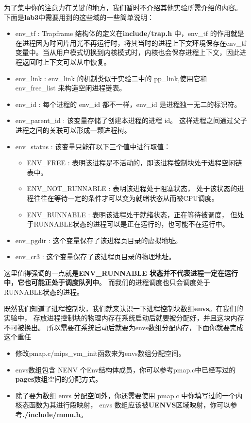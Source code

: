 为了集中你的注意力在关键的地方，我们暂时不介绍其他实验所需介绍的内容。
下面是\textbf{lab3}中需要用到的这些域的一些简单说明：

\begin{itemize}
  \item env\_tf : Trapframe 结构体的定义在\textbf{include/trap.h} 中，env\_tf 的作用就是在进程因为时间片用光不再运行时，将其当时的进程上下文环境保存在env\_tf 变量中。当从用户模式切换到内核模式时，内核也会保存进程上下文，因此进程返回时上下文可以从中恢复。
  \item env\_link : env\_link 的机制类似于实验二中的 pp\_link,使用它和 env\_free\_list 来构造空闲进程链表。
  \item env\_id : 每个进程的 env\_id 都不一样，env\_id 是进程独一无二的标识符。
  \item env\_parent\_id : 该变量存储了创建本进程的进程 id。
  这样进程之间通过父子进程之间的关联可以形成一颗进程树。
  \item env\_status : 该变量只能在以下三个值中进行取值：
  \begin{itemize}
    \item ENV\_FREE : 表明该进程是不活动的，即该进程控制块处于进程空闲链表中。
    \item ENV\_NOT\_RUNNABLE : 表明该进程处于阻塞状态，
    处于该状态的进程往往在等待一定的条件才可以变为就绪状态从而被CPU调度。
    \item ENV\_RUNNABLE : 表明该进程处于就绪状态，正在等待被调度，
    但处于RUNNABLE状态的进程可以是正在运行的，也可能不在运行中。
  \end{itemize}
  \item env\_pgdir : 这个变量保存了该进程页目录的虚拟地址。
  \item env\_cr3 : 这个变量保存了该进程页目录的物理地址。
\end{itemize}

这里值得强调的一点就是\textbf{ENV\_RUNNABLE 状态并不代表进程一定在运行中，它也可能正处于调度队列中}。
而我们的进程调度也只会调度处于RUNNABLE状态的进程。

既然我们知道了进程控制块，我们就来认识一下进程控制块数组\textbf{envs}。在我们的实验中，
存放进程控制块的物理内存在系统启动后就要被分配好，并且这块内存不可被换出。
所以需要在系统启动后就要为envs数组分配内存，下面你就要完成这个重任

\begin{exercise}
  \begin{itemize}
    \item 修改pmap.c/mips\_vm\_init函数来为envs数组分配空间。
    \item envs数组包含 NENV 个Env结构体成员，你可以参考pmap.c中已经写过的\textbf{pages}数组空间的分配方式。
    \item 除了要为数组 envs 分配空间外，你还需要使用 pmap.c 中你填写过的一个内核态函数为其进行段映射，
    envs 数组应该被\textbf{UENVS}区域映射，你可以参考\textbf{./include/mmu.h}。	
  \end{itemize}
\end{exercise}

